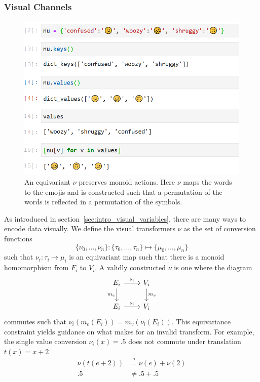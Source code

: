 \documentclass[../main.tex]{subfiles}
\begin{document}
\subsubsection{Visual Channels}
\label{sec:artist_nu}
\begin{figure}[H]
    \includegraphics[width=\textwidth]{figures/math/equivariance_nu.png}
    \caption{An equivariant $\nu$ preserves monoid actions. Here $\nu$ maps the words to the emojis and is constructed such that a permutation of the words is reflected in a permutation of the symbols. }
    \label{fig:artist_nu}
\end{figure}
As introduced in section~\ref{sec:intro_visual_variables}, there are many ways to encode data visually. We define the visual transformers $\nu$ as the set of conversion functions 
\begin{equation}
    \label{eq:nu_expanded}
    \{\nu_{0}, \ldots, \nu_{n}\}: \{\tau_{0}, \ldots, \tau_{n}\} \mapsto \{\mu_{0}, \ldots, \mu_{n}\}
\end{equation}
such that $\nu_i: \tau_i \mapsto \mu_i$ is an equivariant map such that there is a monoid homomorphism from $F_{i}$ to $V_{i}$. A validly constructed $\nu$ is one where the  diagram 
\begin{equation}
    \label{eq:nu_categorical}
\begin{tikzcd}
    E_i \arrow[r] \arrow[r, "\nu_i"] \arrow[d, "m_e"'] & V_i \arrow[d, "m_v"] \\
    E_i \arrow[r, "\nu_i"]                           & V_i               
\end{tikzcd}
\end{equation}
commutes such that $\nu_i(m_e(E_i)) = m_v(\nu_i(E_i))$. This equivariance constraint yields guidance on what makes for an invalid transform. For example, the single value conversion $\nu_{i}(x) = .5$ does not commute under translation  $t(x) = x+2$  
\begin{align}
    \nu(t(e + 2)) & \overset{?}{=} \nu(e) + \nu(2)\\
    .5 &\neq .5 + .5
\end{align}
\end{document}
